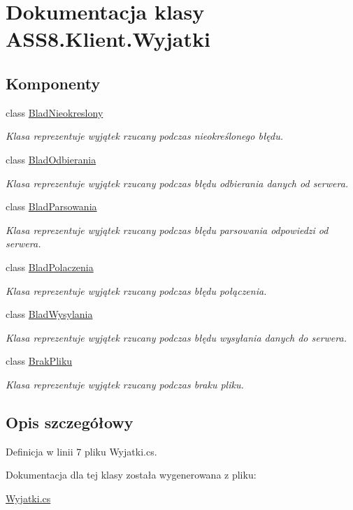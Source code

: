 \hypertarget{a00030}{
\section{Dokumentacja klasy ASS8.Klient.Wyjatki}
\label{d5/d79/a00030}
}
\subsection*{Komponenty}
\begin{CompactItemize}
\item 
class \hyperlink{a00031}{BladNieokreslony}
\begin{CompactList}\small\item\em Klasa reprezentuje wyjątek rzucany podczas nieokreślonego błędu. \item\end{CompactList}\item 
class \hyperlink{a00032}{BladOdbierania}
\begin{CompactList}\small\item\em Klasa reprezentuje wyjątek rzucany podczas błędu odbierania danych od serwera. \item\end{CompactList}\item 
class \hyperlink{a00033}{BladParsowania}
\begin{CompactList}\small\item\em Klasa reprezentuje wyjątek rzucany podczas błędu parsowania odpowiedzi od serwera. \item\end{CompactList}\item 
class \hyperlink{a00034}{BladPolaczenia}
\begin{CompactList}\small\item\em Klasa reprezentuje wyjątek rzucany podczas błędu połączenia. \item\end{CompactList}\item 
class \hyperlink{a00035}{BladWysylania}
\begin{CompactList}\small\item\em Klasa reprezentuje wyjątek rzucany podczas błędu wysyłania danych do serwera. \item\end{CompactList}\item 
class \hyperlink{a00036}{BrakPliku}
\begin{CompactList}\small\item\em Klasa reprezentuje wyjątek rzucany podczas braku pliku. \item\end{CompactList}\end{CompactItemize}


\subsection{Opis szczegółowy}


Definicja w linii 7 pliku Wyjatki.cs.

Dokumentacja dla tej klasy została wygenerowana z pliku:\begin{CompactItemize}
\item 
\hyperlink{a00053}{Wyjatki.cs}\end{CompactItemize}
